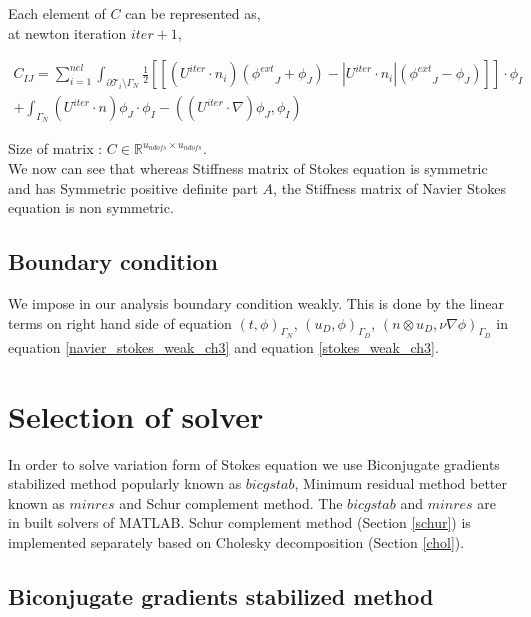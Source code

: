 \documentclass[a4paper]{book}
\begin{document}
Each element of $C$ can be represented as,\\

at newton iteration $iter + 1$,
\begin{flushleft}
\begin{equation} \label{matric C}
\begin{split}
C_{IJ} = \sum_{i=1}^{nel} \int_{\partial \mathcal{T}_i \setminus \Gamma_N} \frac{1}{2} [[(U^{iter} \cdot n_i)({\phi^{ext}}_J + {\phi}_J ) - |U^{iter} \cdot n_i|({{\phi}^{ext}}_J - {\phi}_J)]] \cdot \phi_I \\ + \int_{\Gamma_N} (U^{iter} \cdot n) \phi_J \cdot \phi_I -((U^{iter} \cdot \nabla)\phi_J,\phi_I)
\end{split}
\end{equation}
\end{flushleft}

Size of matrix : $C \in \mathbb{R}^{u_{ndofs} \times u_{ndofs}}$. \\

We now can see that whereas Stiffness matrix of Stokes equation is symmetric and has Symmetric positive definite part $A$, the Stiffness matrix of Navier Stokes equation is non symmetric.

\subsection{Boundary condition}

We impose in our analysis boundary condition weakly. This is done by the linear terms on right hand side of equation  $(t,\phi)_{\Gamma_N}$, $(u_D,\phi)_{\Gamma_D}$, \linebreak $(n \otimes u_D, \nu \nabla \phi)_{\Gamma_D}$ in equation \ref{navier_stokes_weak_ch3} and equation \ref{stokes_weak_ch3}.

\section{Selection of solver}

In order to solve variation form of Stokes equation we use Biconjugate gradients stabilized method popularly known as $bicgstab$, Minimum residual method better known as $minres$ and Schur complement method. The $bicgstab$ and $minres$ are in built solvers of MATLAB. Schur complement method (Section \ref{schur}) is implemented separately based on Cholesky decomposition (Section \ref{chol}).

\subsection{Biconjugate gradients stabilized method}
\end{document}
